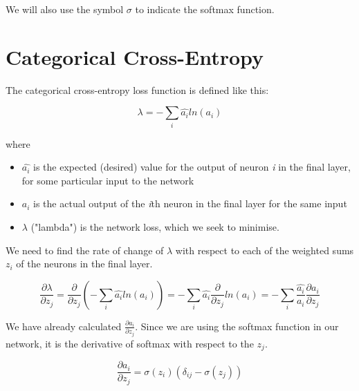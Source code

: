\documentclass[12pt]{article}
\begin{document}
\maketitle

\begin{abstract}

\end{abstract}

We will also use the symbol $\sigma$ to indicate the softmax function.

\section{Categorical Cross-Entropy}

The categorical cross-entropy loss function is defined like this:

\begin{equation} \label{eq:cce}
    \lambda = -\sum_i \hat{a_i} ln(a_i)
\end{equation}

    where

    \begin{itemize}
        \item[] $\hat{a_i}$ is the expected (desired) value for the output of neuron \textit{i} in the final layer, for some particular input to the network
        \item[] $a_i$ is the actual output of the \textit{i}th neuron in the final layer for the same input
        \item[] $\lambda$ ("lambda") is the network loss, which we seek to minimise.  
    \end{itemize}

    We need to find the rate of change of $\lambda$ with respect to each of the weighted sums $z_i$ of the neurons in the final layer.

\begin{equation} \label{eq:ccederiv1}
    \frac{\partial \lambda}{\partial z_j}=
    \frac{\partial}{\partial z_j}\left( -\sum_i \hat{a_i} ln(a_i)\right)
    =-\sum_i \hat{a_i} \frac{\partial}{\partial z_j}ln(a_i)
    =-\sum_i \frac{\hat{a_i}}{a_i} \frac{\partial a_i}{\partial z_j}
\end{equation}

We have already calculated $\frac{\partial a_i}{\partial z_j}$. Since we are using the softmax function in our network, it is the derivative of softmax with respect to the $z_j$.

$$
\frac{\partial a_i}{\partial z_j}=\sigma(z_i)(\delta_{ij} - \sigma(z_j))
$$
\end{document}
